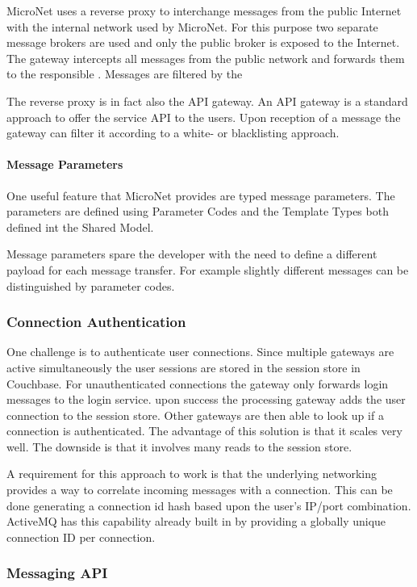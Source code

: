 MicroNet uses a reverse proxy to interchange messages from the public Internet
with the internal network used by MicroNet. For this purpose two separate
message brokers are used and only the public broker is exposed to the Internet.
The gateway intercepts all messages from the public network and forwards them to
the responsible \ms{}. Messages are filtered by the

The reverse proxy is in fact also the API gateway. An API gateway is a standard
approach to offer the service API to the users. Upon reception of a message the
gateway can filter it according to a white- or blacklisting approach.

\paragraph{Message Parameters}

One useful feature that MicroNet provides are typed message parameters. The
parameters are defined using Parameter Codes and the Template Types both defined
int the Shared Model.

Message parameters spare the developer with the need to define a different
payload for each message transfer. For example slightly different messages can
be distinguished by parameter codes.

\subsubsection{Connection Authentication}

One challenge is to authenticate user connections. Since multiple gateways are
active simultaneously the user sessions are stored in the session store in
Couchbase. For unauthenticated connections the gateway only forwards login
messages to the login service. upon success the processing gateway adds the user
connection to the session store. Other gateways are then able to look up if a
connection is authenticated. The advantage of this solution is that it scales
very well. The downside is that it involves many reads to the session store.

A requirement for this approach to work is that the underlying networking
provides a way to correlate incoming messages with a connection. This can be
done generating a connection id hash based upon the user's IP/port combination.
ActiveMQ has this capability already built in by providing a globally unique
connection ID per connection.

\subsubsection{Messaging API}


